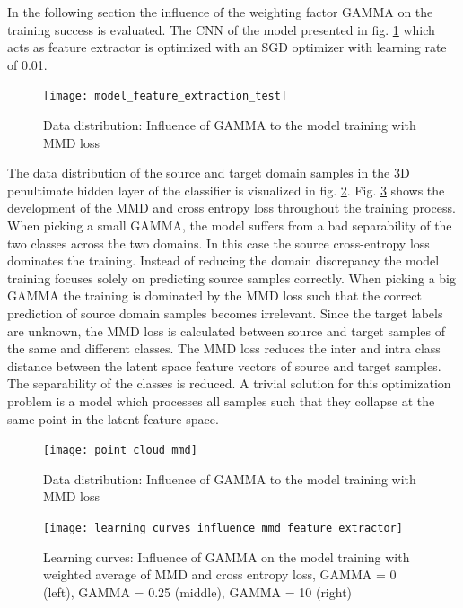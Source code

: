 In the following section the influence of the weighting factor GAMMA on the training success is evaluated. The CNN of the model presented in fig. \ref{fig:model_feature_extraction_test} which acts as feature extractor is optimized with an SGD optimizer with learning rate of 0.01.


\begin{figure}[htpb]
  \centering
  \texttt{[image: model\_feature\_extraction\_test]}
  \caption {Data distribution: Influence of GAMMA to the model training with MMD loss} \label{fig:model_feature_extraction_test}
\end{figure}


The data distribution of the source and target domain samples in the 3D penultimate hidden layer of the classifier is visualized in fig. \ref{fig:point_cloud_mmd}. Fig. \ref{fig:learning_curves_influence_mmd_feature_extractor} shows the development of the MMD and cross entropy loss throughout the training process. When picking a small GAMMA, the model suffers from a bad separability of the two classes across the two domains. In this case the source cross-entropy loss dominates the training. Instead of reducing the domain discrepancy the model training focuses solely on predicting source samples correctly. When picking a big GAMMA the training is dominated by the MMD loss such that the correct prediction of source domain samples becomes irrelevant. Since the target labels are unknown, the MMD loss is calculated between source and target samples of the same and different classes. The MMD loss reduces the inter and intra class distance between the latent space feature vectors of source and target samples. The separability of the classes is reduced. A trivial solution for this optimization problem is a model which processes all samples such that they collapse at the same point in the latent feature space.


\begin{figure}[htpb]
  \centering
  \texttt{[image: point\_cloud\_mmd]}
  \caption {Data distribution: Influence of GAMMA to the model training with MMD loss} \label{fig:point_cloud_mmd}
\end{figure}


\begin{figure}[htpb]
  \centering
  \texttt{[image: learning\_curves\_influence\_mmd\_feature\_extractor]}
  \caption {Learning curves: Influence of GAMMA on the model training with weighted average of MMD and cross entropy loss, GAMMA = 0 (left), GAMMA = 0.25 (middle), GAMMA = 10 (right)} \label{fig:learning_curves_influence_mmd_feature_extractor}
\end{figure}


